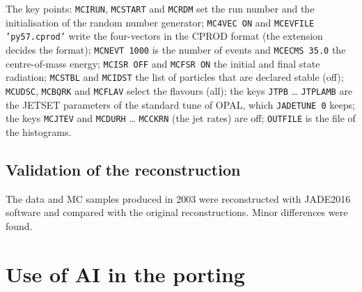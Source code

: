 
The key points: \texttt{MCIRUN}, \texttt{MCSTART} and \texttt{MCRDM} set the run number and the initialisation of the random number generator; \texttt{MC4VEC ON} and \texttt{MCEVFILE 'py57.cprod'} write the four-vectors in the CPROD format (the extension decides the format);
\texttt{MCNEVT 1000} is the number of events and \texttt{MCECMS 35.0} the centre-of-mass energy; \texttt{MCISR OFF} and \texttt{MCFSR ON} the initial and final state radiation; \texttt{MCSTBL} and \texttt{MCIDST} the list of particles that are declared stable (off);
\texttt{MCUDSC}, \texttt{MCBQRK} and \texttt{MCFLAV} select the flavours (all); the keys \texttt{JTPB} \dots{} \texttt{JTPLAMB} are the JETSET parameters of the standard tune of OPAL, which \texttt{JADETUNE 0} keeps;
the keys \texttt{MCJTEV} and \texttt{MCDURH} \dots{} \texttt{MCCKRN} (the jet rates) are off; \texttt{OUTFILE} is the file of the histograms.

\subsection{Validation of the reconstruction}
The data and MC samples produced in 2003 were reconstructed with JADE2016 software and compared with the 
original reconstructions. Minor differences were found.


\section{Use of AI in the porting}
\label{sec:ai}

